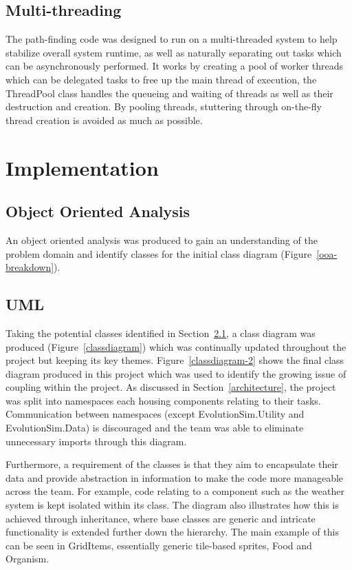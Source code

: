 \documentclass[a4paper, oneside, 11pt]{report}
\begin{document}
\section{Multi-threading} \label{multithreading}
The path-finding code was designed to run on a multi-threaded system to help stabilize overall system runtime, as well as naturally separating out tasks which can be asynchronously performed. It works by creating a pool of worker threads which can be delegated tasks to free up the main thread of execution, the ThreadPool class handles the queueing and waiting of threads as well as their destruction and creation. By pooling threads, stuttering through on-the-fly thread creation is avoided as much as possible.

\chapter{Implementation} \label{implementation}

\section{Object Oriented Analysis}\label{ooa}
An object oriented analysis was produced to gain an understanding of the problem domain and identify classes for the initial class diagram (Figure~\ref{ooa-breakdown}).

\section{UML}\label{uml}
Taking the potential classes identified in Section~\ref{ooa}, a class diagram was produced (Figure~\ref{classdiagram}) which was continually updated throughout the project but keeping its key themes. Figure~\ref{classdiagram-2} shows the final class diagram produced in this project which was used to identify the growing issue of coupling within the project. As discussed in Section~\ref{architecture}, the project was split into namespaces each housing components relating to their tasks. Communication between namespaces (except EvolutionSim.Utility and EvolutionSim.Data) is discouraged and the team was able to eliminate unnecessary imports through this diagram.

Furthermore, a requirement of the classes is that they aim to encapsulate their data and provide abstraction in information to make the code more manageable across the team. For example, code relating to a component such as the weather system is kept isolated within its class. The diagram also illustrates how this is achieved through inheritance, where base classes are generic and intricate functionality is extended further down the hierarchy. The main example of this can be seen in GridItems, essentially generic tile-based sprites, Food and Organism.
\end{document}
